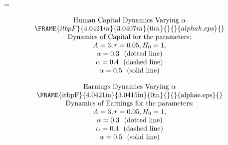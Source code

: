 \documentclass{article}
\numberwithin{equation}{section}
\begin{document}
=

\pagebreak

\begin{equation*}
\begin{tabular}{c}
$\text{Human Capital Dynamics Varying }\alpha $ \\ 
$\FRAME{itbpF}{4.0421in}{3.0407in}{0in}{}{}{alphah.eps}{\special{language
"Scientific Word";type "GRAPHIC";maintain-aspect-ratio TRUE;display
"USEDEF";valid_file "F";width 4.0421in;height 3.0407in;depth
0in;original-width 5.8219in;original-height 4.3708in;cropleft "0";croptop
"1";cropright "1";cropbottom "0";filename 'alphaH.eps';file-properties
"XNPEU";}}$ \\ 
$\text{Dynamics of Capital for the parameters:}$ \\ 
$A=3,r=0.05,H_{0}=1,$ \\ 
$\alpha =0.3\text{ \ (dotted line)}$ \\ 
$\alpha =0.4\text{ \ (dashed line)}$ \\ 
$\alpha =0.5\text{ \ (solid line)}$%
\end{tabular}%
\bigskip
\end{equation*}

\pagebreak

\begin{equation*}
\begin{tabular}{c}
Earnings$\text{ Dynamics Varying }\alpha $ \\ 
\FRAME{itbpF}{4.0421in}{3.0415in}{0in}{}{}{alphae.eps}{\special{language
"Scientific Word";type "GRAPHIC";maintain-aspect-ratio TRUE;display
"USEDEF";valid_file "F";width 4.0421in;height 3.0415in;depth
0in;original-width 5.8219in;original-height 4.3708in;cropleft "0";croptop
"1";cropright "1";cropbottom "0";filename 'alphaE.eps';file-properties
"XNPEU";}} \\ 
$\text{Dynamics of Earnings for the parameters:}$ \\ 
$A=3,r=0.05,H_{0}=1,$ \\ 
$\alpha =0.3\text{ \ (dotted line)}$ \\ 
$\alpha =0.4\text{ \ (dashed line)}$ \\ 
$\alpha =0.5\text{ \ (solid line)}$%
\end{tabular}%
\end{equation*}
\end{document}

